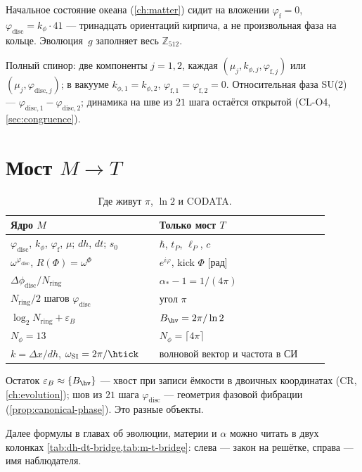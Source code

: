\begin{remark}
Начальное состояние океана (\cref{ch:matter}) сидит на вложении
$\varphi_{\mathrm{f}}=0$, $\varphi_{\mathrm{disc}}=k_\phi\cdot 41$ --- тринадцать ориентаций кирпича,
а не произвольная фаза на кольце.
Эволюция~$g$ заполняет весь $\mathbb{Z}_{512}$.
\end{remark}

Полный спинор: две компоненты $j=1,2$, каждая $(\mu_j,k_{\phi,j},\varphi_{\mathrm{f},j})$
или $(\mu_j,\varphi_{\mathrm{disc},j})$; в вакууме $k_{\phi,1}=k_{\phi,2}$, $\varphi_{\mathrm{f},1}=\varphi_{\mathrm{f},2}=0$.
Относительная фаза SU(2) --- $\varphi_{\mathrm{disc},1}-\varphi_{\mathrm{disc},2}$; динамика на шве из $21$ шага остаётся открытой
(CL-O4, \cref{sec:congruence}).

\section{Мост \texorpdfstring{$M\to T$}{M to T}}
\label{sec:coords-bridge}

\begin{table}[ht]
\centering
\caption{Где живут $\pi$, $\ln 2$ и CODATA.}
\label{tab:m-t-bridge}
\begin{tabular}{@{}p{0.42\linewidth}p{0.48\linewidth}@{}}
\toprule
Ядро $M$ & Только мост $T$ \\
\midrule
$\varphi_{\mathrm{disc}}$, $k_\phi$, $\varphi_{\mathrm{f}}$, $\mu$; $dh$, $dt$; $s_0$ & $\hbar$, $t_P$, $\ell_P$, $c$ \\
$\omega^{\varphi_{\mathrm{disc}}}$, $R(\Phi)=\omega^{\Phi}$ & $e^{i\varphi}$, kick $\Phi$ [рад] \\
$\Delta\phi_{\mathrm{disc}}/N_{\mathrm{ring}}$ & $\alpha_*-1=1/(4\pi)$ \\
$N_{\mathrm{ring}}/2$ шагов $\varphi_{\mathrm{disc}}$ & угол $\pi$ \\
$\log_2 N_{\mathrm{ring}}+\varepsilon_B$ & $B_{\hv}=2\pi/\ln 2$ \\
$N_\phi=13$ & $N_\phi=\lceil 4\pi\rceil$ \\
$k=\Delta x/dh$, $\omega_{\mathrm{SI}}=2\pi/\htick$ & волновой вектор и частота в СИ \\
\bottomrule
\end{tabular}
\end{table}

\begin{remark}
Остаток $\varepsilon_B\approx\{B_{\hv}\}$ --- хвост при записи ёмкости в двоичных координатах
(CR, \cref{ch:evolution}); шов из $21$ шага $\varphi_{\mathrm{disc}}$ --- геометрия фазовой фибрации
(\cref{prop:canonical-phase}). Это разные объекты.
\end{remark}

Далее формулы в главах об эволюции, материи и $\alpha$ можно читать в двух колонках
\cref{tab:dh-dt-bridge,tab:m-t-bridge}: слева --- закон на решётке, справа --- имя наблюдателя.

